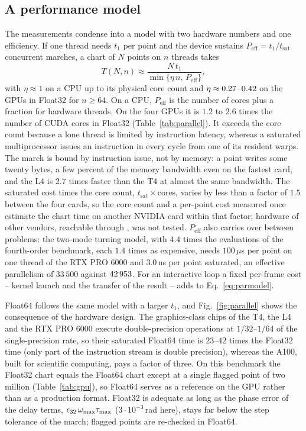 \subsection{A performance model}\label{sec:parallel-model}

The measurements condense into a model with two hardware numbers and one
efficiency. If one thread needs $t_1$ per point and the device sustains
$P_{\mathrm{eff}}=t_1/t_{\mathrm{sat}}$ concurrent marches, a chart of $N$
points on $n$ threads takes
\begin{equation}\label{eq:parmodel}
  T(N,n) \approx \frac{N\,t_1}{\min\{\eta\,n,\,P_{\mathrm{eff}}\}} ,
\end{equation}
with $\eta\approx1$ on a CPU up to its physical core count and
$\eta\approx0.27$--$0.42$ on the GPUs in Float32 for $n\ge64$.
On a CPU, $P_{\mathrm{eff}}$ is the number of cores plus a fraction for
hardware threads. On the four GPUs it is $1.2$ to $2.6$ times the number of
CUDA cores in Float32 (Table~\ref{tab:parallel}). It exceeds the core count because a lone thread is limited by instruction
latency, whereas a saturated multiprocessor issues an instruction in every
cycle from one of its resident warps. The march is bound by instruction issue,
not by memory: a point writes some twenty bytes, a few percent of the memory
bandwidth even on the fastest card, and the L4 is $2.7$ times faster than the
T4 at almost the same bandwidth. The saturated cost times the core count,
$t_{\mathrm{sat}}\times\text{cores}$, varies by less than a factor of $1.5$
between the four cards, so the core count and a per-point cost measured once
estimate the chart time on another NVIDIA card within that factor; hardware of
other vendors, reachable through , was not tested.
$P_{\mathrm{eff}}$ also carries over between problems: the two-mode turning
model, with $4.4$ times the evaluations of the fourth-order benchmark, each
$1.4$ times as expensive, needs $100\,\mu$s per point on one thread of the
RTX PRO 6000 and $3.0$\,ns per point saturated, an effective parallelism of
$33\,500$ against $42\,953$. For an interactive loop a fixed per-frame
cost -- kernel launch and the transfer of the result -- adds to
Eq.~\eqref{eq:parmodel}.

Float64 follows the same model with a larger $t_1$, and Fig.~\ref{fig:parallel}
shows the consequence of the hardware design. The graphics-class chips of the
T4, the L4 and the RTX PRO 6000 execute double-precision operations at
$1/32$--$1/64$ of the single-precision rate, so their saturated Float64 time is
$23$--$42$ times the Float32 time (only part of the instruction stream is
double precision), whereas the A100, built for scientific computing, pays a
factor of three. On this benchmark the Float32 chart equals the Float64 chart
except at a single flagged point of two million (Table~\ref{tab:gpu}), so
Float64 serves as a reference on the GPU rather than as a production format.
Float32 is adequate as long as the phase error of the delay terms,
$\epsilon_{32}\,\omega_{\mathrm{max}}\tau_{\max}$ ($3\cdot10^{-3}$\,rad here), stays far below
the step tolerance of the march; flagged points are re-checked in Float64.

